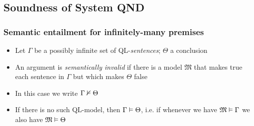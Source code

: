 \fi %









\subsection{Soundness of System QND}

\begin{frame}
\frametitle{Semantic entailment for infinitely-many premises}

\begin{itemize}[<+->]

\item Let $\Gamma$ be a possibly infinite set of QL-\emph{sentences}; $\Theta$ a conclusion



\item An argument is \emph{semantically invalid} if there is a model $\mathfrak{M}$ that makes true each sentence in $\Gamma$ but which makes $\Theta$ false

\item In this case we write $\Gamma \nvDash \Theta$

\item If there is no such QL-model, then $\Gamma \vDash \Theta$, i.e. if whenever we have $\mathfrak{M} \vDash \Gamma$ we also have $\mathfrak{M} \vDash \Theta$

\end{itemize}
\end{frame}

